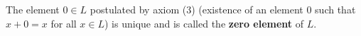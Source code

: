 The element $0 \in L$ postulated by axiom (3) (existence of an element $0$ such that $x + 0 = x$ for all $x \in L$) is unique and is called the \textbf{zero element} of $L$.
